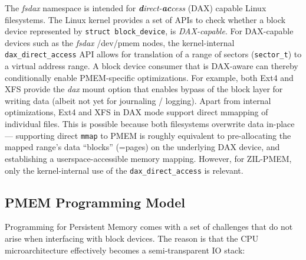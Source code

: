 \documentclass[12pt,a4paper,twoside]{book}
\begin{document}
The \textit{fsdax} namespace is intended for \textit{\textbf{d}irect-\textbf{ac}cess} (DAX) capable Linux filesystems.
The Linux kernel provides a set of APIs to check whether a block device represented by \lstinline[style=figurepseudocode]{struct block_device}, is \textit{DAX-capable}.
For DAX-capable devices such as the \textit{fsdax} /dev/pmem nodes, the kernel-internal \lstinline{dax_direct_access} API allows for translation of a range of sectors (\lstinline{sector_t}) to a virtual address range.
A block device consumer that is DAX-aware can thereby conditionally enable PMEM-specific optimizations.
For example, both Ext4 and XFS provide the \textit{dax} mount option that enables bypass of the block layer for writing data (albeit not yet for journaling / logging).
Apart from internal optimizations, Ext4 and XFS in DAX mode support direct mmapping of individual files.
This is possible because both filesystems overwrite data in-place --- supporting direct \lstinline{mmap} to PMEM is roughly equivalent to pre-allocating the mapped range's data ``blocks'' (=pages) on the underlying DAX device, and establishing a userspace-accessible memory mapping.
However, for ZIL-PMEM, only the kernel-internal use of the \lstinline{dax_direct_access} is relevant.


\subsection{PMEM Programming Model}\label{sec:background:pmemprogrammingmodel}

Programming for Persistent Memory comes with a set of challenges that do not arise when interfacing with block devices.
The reason is that the CPU microarchitecture effectively becomes a semi-transparent IO stack:
\end{document}
